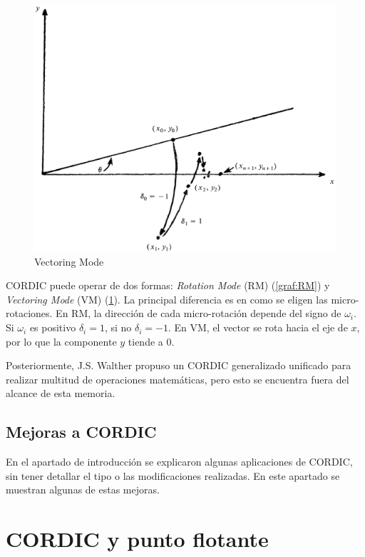 \begin{figure}[ht]
	\centering
	\includegraphics[width=\textwidth]{archivos/CORDIC/VectoringMode.png}
	\caption{Vectoring Mode}
	\label{graf:VM}
\end{figure}

CORDIC puede operar de dos formas: \textit{Rotation Mode} (RM) (\ref{graf:RM}) y \textit{Vectoring Mode} (VM) (\ref{graf:VM}). La principal diferencia es en como se eligen las micro-rotaciones. En RM, la dirección de cada micro-rotación depende del signo de $\omega_{i}$. Si $\omega_{i}$ es positivo $\delta_{i} = 1$, si no $\delta_{i} = -1$. En VM, el vector se rota hacia el eje de $x$, por lo que la componente $y$ tiende a 0.

Posteriormente, J.S. Walther propuso un CORDIC generalizado unificado para realizar multitud de operaciones matemáticas, pero esto se encuentra fuera del alcance de esta memoria.

\section{Mejoras a CORDIC}

En el apartado de introducción se explicaron algunas aplicaciones de CORDIC, sin tener detallar el tipo o las modificaciones realizadas. En este apartado se muestran algunas de estas mejoras.



\chapter{CORDIC y punto flotante}

